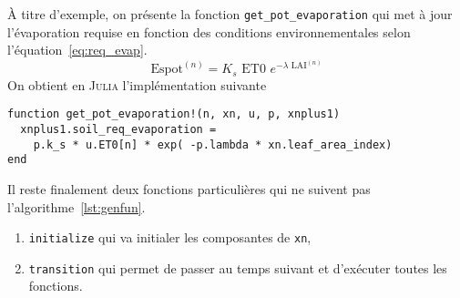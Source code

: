 
À titre d'exemple, on présente la fonction \lstinline|get_pot_evaporation| qui met
à jour l'évaporation requise en fonction des conditions environnementales
selon l'équation~\ref{eq:req_evap}.
\begin{equation}
  \text{Espot}^{(n)} = K_s \text{ ET0 } e^{-\lambda \text{ LAI}^{(n)}}
  \label{eq:req_evap}
\end{equation}
On obtient en \textsc{Julia} l'implémentation suivante
\begin{lstlisting}
function get_pot_evaporation!(n, xn, u, p, xnplus1)
  xnplus1.soil_req_evaporation = 
    p.k_s * u.ET0[n] * exp( -p.lambda * xn.leaf_area_index) 
end
\end{lstlisting}

Il reste finalement deux fonctions particulières qui ne suivent
pas l'algorithme~\ref{lst:genfun}.

\begin{enumerate}
  \item \lstinline|initialize| qui va initialer les composantes de \lstinline|xn|,
  \item \lstinline|transition| qui permet de passer au temps suivant et d'exécuter toutes les fonctions.
\end{enumerate}






